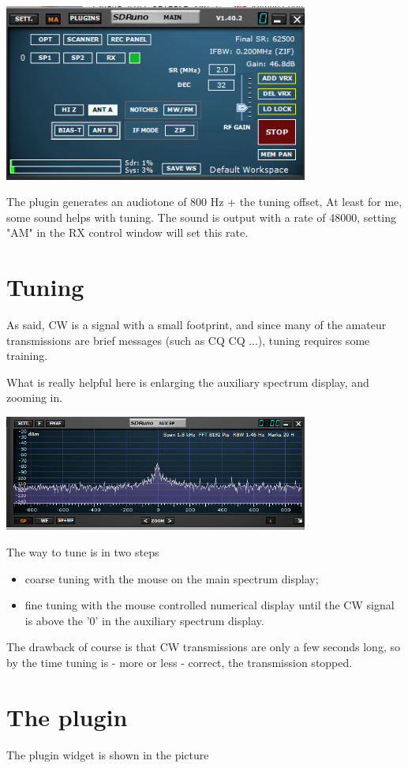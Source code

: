 \documentclass[11pt]{article}
\begin{document}
\includegraphics[width=100mm]{main-widget.png}

The plugin generates an audiotone of 800 Hz + the tuning offset,
At least for me, some sound helps with tuning.
The sound is output with a rate of 48000, setting "AM" in the RX control window
will set this rate.

\section{Tuning}
As said, CW is a signal with a small footprint, and since many of
the amateur transmissions are brief messages (such as CQ CQ ...), tuning
requires some training.
\par
What is really helpful here is enlarging the auxiliary spectrum display,
and zooming in.

\includegraphics[width=100mm]{auxiliary-spectrum-display.png}

The way to tune is in two steps
\begin{itemize}
\item coarse tuning with the mouse on the main spectrum display;
\item fine tuning with the mouse controlled numerical display until the
CW signal is above the '0' in the auxiliary spectrum display.
\end{itemize}
The drawback of course is that CW transmissions are only a few seconds long,
so by the time tuning is - more or less - correct, the transmission stopped.
\section{The plugin}
The plugin widget  is shown in the picture
\end{document}
